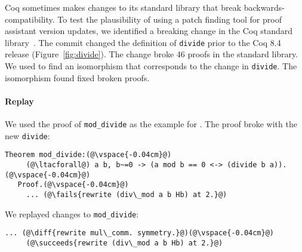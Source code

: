 Coq sometimes makes changes to its standard library that break
backwards-compatibility. %
To test the plausibility of using a patch finding tool for proof assistant version updates,
we identified a breaking change in the Coq standard library~\cite{coq84commit}.
The commit changed the definition of \lstinline{divide} prior to the Coq 8.4 release (Figure~\ref{fig:divide}).
The change broke 46 proofs in the standard library.
We used \sysname to find an isomorphism that corresponds to the change in \lstinline{divide}.
The isomorphism \sysname found fixed broken proofs.

\paragraph{Replay} We used the proof of \lstinline{mod_divide} as the example for \sysname.
The proof broke with the new \lstinline{divide}:

\begin{lstlisting}[language=coq]
   Theorem mod_divide:(@\vspace{-0.04cm}@)
     (@\ltacforall@) a b, b~=0 -> (a mod b == 0 <-> (divide b a)).(@\vspace{-0.04cm}@)
   Proof.(@\vspace{-0.04cm}@)
     ... (@\fails{rewrite (div\_mod a b Hb) at 2.}@)
\end{lstlisting}

We replayed changes to \lstinline{mod_divide}:

\begin{lstlisting}[language=coq]
     ... (@\diff{rewrite mul\_comm. symmetry.}@)(@\vspace{-0.04cm}@)
     (@\succeeds{rewrite (div\_mod a b Hb) at 2.}@)
\end{lstlisting}

